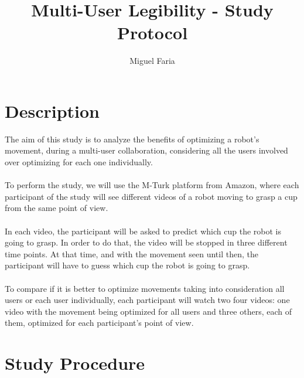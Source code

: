 \documentclass[a4paper,11pt,times,doublespace]{article}
\title{Multi-User Legibility - Study Protocol}
\author{Miguel Faria}
\begin{document}
	
\maketitle

\section{Description}

The aim of this study is to analyze the benefits of optimizing a robot's movement, during a multi-user collaboration, considering all the users involved over optimizing for each one individually.\\\\
%
To perform the study, we will use the M-Turk platform from Amazon, where each participant of the study will see different videos of a robot moving to grasp a cup from the same point of view.\\\\
%
In each video, the participant will be asked to predict which cup the robot is going to grasp. In order to do that, the video will be stopped in three different time points. At that time, and with the movement seen until then, the participant will have to guess which cup the robot is going to grasp.\\\\
%
To compare if it is better to optimize movements taking into consideration all users or each user individually, each participant will watch two four videos: one video with the movement being optimized for all users and three others, each of them, optimized for each participant's point of view.

\section{Study Procedure}
\end{document}
